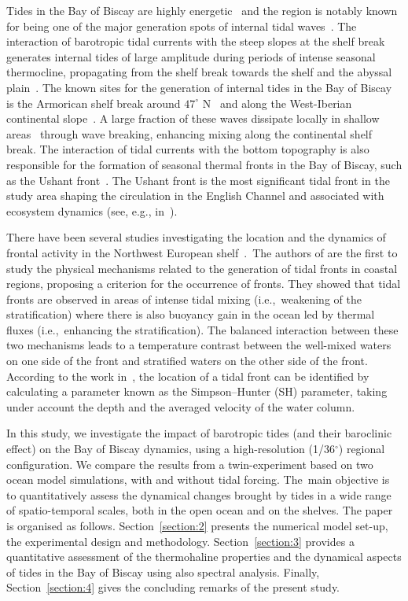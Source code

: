 \documentclass[jmse,article,accept,moreauthors,pdftex]{Definitions/mdpi}
\begin{document}
Tides in the Bay of Biscay are highly energetic~\cite{LECANN1990,Pairaud2008} and the region is notably known for being one of the major generation spots of internal tidal waves~\cite{BAINES1982}. The interaction of barotropic tidal currents with the steep slopes at the shelf break generates internal tides of large amplitude during periods of intense seasonal thermocline, propagating from the shelf break towards the shelf and the abyssal plain~\cite{Pingree1986,PINGREE1995,Pichon2006,Pairaud2010}. The known sites for the generation of internal tides in the Bay of Biscay is the Armorican shelf break around $47^\circ$ N~\cite{Pairaud2010} and along the West-Iberian continental slope~\cite{Pichon2006}. A large fraction of these waves dissipate locally in shallow areas~\cite{Egbert2003} through wave breaking, enhancing mixing along the continental shelf break. The interaction of tidal currents with the bottom topography is also responsible for the formation of seasonal thermal fronts in the Bay of Biscay, such as the Ushant front~\cite{LEBOYER2009,PASQUET2012,CHEVALLIER2014}. The Ushant front is the most significant tidal front in the study area shaping the circulation in the English Channel and associated with ecosystem dynamics (see, e.g., in~\cite{SCHULTES2013}). 

There have been several studies investigating the location and the dynamics of frontal activity in the Northwest European shelf~\cite{simpson1981,bowerS1987,holt2008,odea2012,Yelekci2017}.~The authors of \cite{simpson1974} are the first to study the physical mechanisms related to the generation of tidal fronts in coastal regions, proposing a criterion for the occurrence of fronts. They showed that tidal fronts are observed in areas of intense tidal mixing (i.e.,~weakening of the stratification) where there is also buoyancy gain in the ocean led by thermal fluxes (i.e.,~enhancing the stratification). The balanced interaction between these two mechanisms leads to a temperature contrast between the well-mixed waters on one side of the front and stratified waters on the other side of the front. According to the work in~\cite{simpson1974}, the location of a tidal front can be identified by calculating a parameter known as the Simpson--Hunter (SH) parameter, taking under account the depth and the averaged velocity of the water column.

In this study, we investigate the impact of barotropic tides (and their baroclinic effect) on the Bay of Biscay dynamics, using a high-resolution (1/36$^\circ$) regional configuration. We compare the results from a twin-experiment based on two ocean model simulations, with and without tidal forcing. The~main objective is to quantitatively assess the dynamical changes brought by tides in a wide range of spatio-temporal scales, both in the open ocean and on the shelves. The paper is organised as follows. Section~\ref{section:2} presents the numerical model set-up, the experimental design and methodology. Section~\ref{section:3} provides a quantitative assessment of the thermohaline properties and the dynamical aspects of tides in the Bay of Biscay using also spectral analysis. Finally, Section~\ref{section:4} gives the concluding remarks of the present study.
\end{document}
